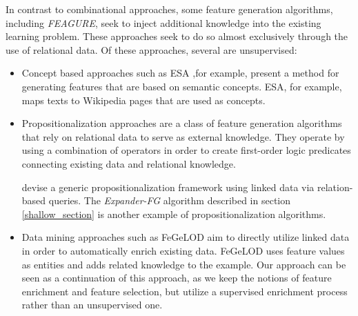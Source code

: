 \documentclass{article}
\theoremstyle{definition}
\begin{document}

In contrast to combinational approaches, some feature generation algorithms, including \emph{FEAGURE}, seek to inject additional knowledge into the existing learning problem. These approaches seek to do so almost exclusively through the use of relational data. 
Of these approaches, several are unsupervised:
\begin{itemize}
	\item Concept based approaches such as ESA \citep{gabrilovich2009wikipediafull} ,for example, present a method for generating features that are based on semantic concepts. %
	ESA, for example, maps texts to Wikipedia pages that are used as concepts.
	\item Propositionalization \citep{kramer2000bottom} approaches are a class of feature generation algorithms that rely on relational data to serve as external knowledge. They operate by using a combination of operators in order to create first-order logic predicates connecting existing data and relational knowledge. 
	
	\citep{cheng2011automatedfull} devise a generic propositionalization framework  using linked data via relation-based queries.%
	The \emph{Expander-FG} algorithm described in section \ref{shallow_section} is another example of propositionalization algorithms.
	\item Data mining approaches such as FeGeLOD \citep{paulheim2012unsupervisedfull} aim to directly utilize linked data in order to automatically enrich existing data. %
	FeGeLOD uses feature values as entities and adds related knowledge to the example. %
	Our approach can be seen as a continuation of this approach, as we keep the notions of feature enrichment and feature selection, but utilize a supervised enrichment process rather than an unsupervised one.
\end{itemize}
\end{document}
